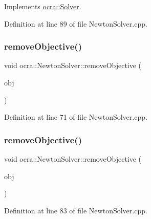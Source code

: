 Implements \hyperlink{classocra_1_1Solver_ab1903098e25c16a9f92c36d37967e8fa}{ocra\+::\+Solver}.



Definition at line 89 of file Newton\+Solver.\+cpp.

\hypertarget{classocra_1_1NewtonSolver_a0f2c1366ef076469735020c20f759dd6}{}\label{classocra_1_1NewtonSolver_a0f2c1366ef076469735020c20f759dd6} 
\subsubsection{\texorpdfstring{remove\+Objective()}{removeObjective()}\hspace{0.1cm}{\footnotesize\ttfamily [1/2]}}
{\footnotesize\ttfamily void ocra\+::\+Newton\+Solver\+::remove\+Objective (\begin{DoxyParamCaption}\item[{\hyperlink{classocra_1_1Function}{Function} \&}]{obj }\end{DoxyParamCaption})}



Definition at line 71 of file Newton\+Solver.\+cpp.

\hypertarget{classocra_1_1NewtonSolver_a99308db30e18ed33f7797c308e03ff92}{}\label{classocra_1_1NewtonSolver_a99308db30e18ed33f7797c308e03ff92} 
\subsubsection{\texorpdfstring{remove\+Objective()}{removeObjective()}\hspace{0.1cm}{\footnotesize\ttfamily [2/2]}}
{\footnotesize\ttfamily void ocra\+::\+Newton\+Solver\+::remove\+Objective (\begin{DoxyParamCaption}\item[{\hyperlink{namespaceocra_a37a91885f4fa5c523d22cb15d5673062}{Generic\+Objective} \&}]{obj }\end{DoxyParamCaption})}



Definition at line 83 of file Newton\+Solver.\+cpp.

\hypertarget{classocra_1_1NewtonSolver_a4fc7eba127f6975a0e8947f39d24629a}{}\label{classocra_1_1NewtonSolver_a4fc7eba127f6975a0e8947f39d24629a} 
